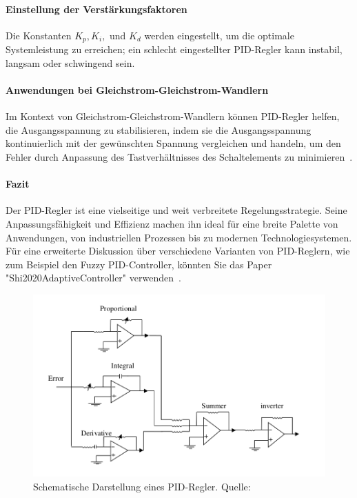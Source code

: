 \paragraph{Einstellung der Verstärkungsfaktoren}
Die Konstanten \( K_p, K_i, \) und \( K_d \) werden eingestellt, um die optimale Systemleistung zu erreichen; ein schlecht eingestellter PID-Regler kann instabil, langsam oder schwingend sein.

\paragraph{Anwendungen bei Gleichstrom-Gleichstrom-Wandlern}
Im Kontext von Gleichstrom-Gleichstrom-Wandlern können PID-Regler helfen, die Ausgangsspannung zu stabilisieren, indem sie die Ausgangsspannung kontinuierlich mit der gewünschten Spannung vergleichen und handeln, um den Fehler durch Anpassung des Tastverhältnisses des Schaltelements zu minimieren~\cite[p.~4]{Almawlawe2023}.

\paragraph{Fazit}
Der PID-Regler ist eine vielseitige und weit verbreitete Regelungsstrategie. Seine Anpassungsfähigkeit und Effizienz machen ihn ideal für eine breite Palette von Anwendungen, von industriellen Prozessen bis zu modernen Technologiesystemen. Für eine erweiterte Diskussion über verschiedene Varianten von PID-Reglern, wie zum Beispiel den Fuzzy PID-Controller, könnten Sie das Paper "Shi2020AdaptiveController" verwenden~\cite[p.~9]{Shi2020AdaptiveController}.


\begin{figure}[htbp]
    \centering
    \includegraphics[width=0.7\linewidth]{2Grundlagen/13PID.png}
    \caption{Schematische Darstellung eines PID-Regler. Quelle: \cite[p.~18]{SwainBaid2014}}
    \label{fig:dcdc_converter}
\end{figure}
